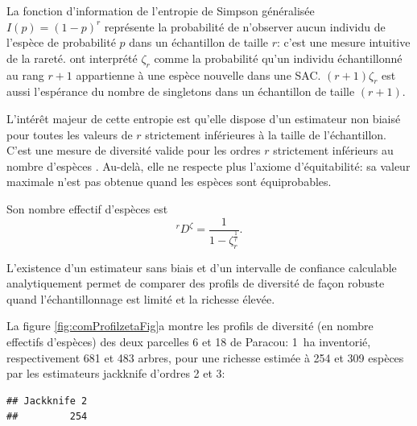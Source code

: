 \documentclass[
  11pt,
  french,
  a4paper,
  extrafontsizes,onecolumn,openright
  ]{memoir}
\newenvironment{Shaded}{\begin{snugshade}}{\end{snugshade}}
\newcommand{\AttributeTok}[1]{\textcolor[rgb]{0.13,0.29,0.53}{#1}}
\newcommand{\DecValTok}[1]{\textcolor[rgb]{0.00,0.00,0.81}{#1}}
\newcommand{\FunctionTok}[1]{\textcolor[rgb]{0.13,0.29,0.53}{\textbf{#1}}}
\newcommand{\NormalTok}[1]{#1}
\newcommand{\OtherTok}[1]{\textcolor[rgb]{0.56,0.35,0.01}{#1}}
\newcommand{\SpecialCharTok}[1]{\textcolor[rgb]{0.81,0.36,0.00}{\textbf{#1}}}
\newcommand{\StringTok}[1]{\textcolor[rgb]{0.31,0.60,0.02}{#1}}
\begin{document}
La fonction d'information de l'entropie de Simpson généralisée \(I(p)=(1-p)^r\) représente la probabilité de n'observer aucun individu de l'espèce de probabilité \(p\) dans un échantillon de taille \(r\): c'est une mesure intuitive de la rareté.
\textcite{Chao2013} ont interprété \(\zeta_r\) comme la probabilité qu'un individu échantillonné au rang \(r+1\) appartienne à une espèce nouvelle dans une SAC.
\((r+1)\zeta_r\) est aussi l'espérance du nombre de singletons dans un échantillon de taille \((r+1)\).

L'intérêt majeur de cette entropie est qu'elle dispose d'un estimateur non biaisé pour toutes les valeurs de \(r\) strictement inférieures à la taille de l'échantillon.
C'est une mesure de diversité valide pour les ordres \(r\) strictement inférieurs au nombre d'espèces \autocite{Grabchak2016}.
Au-delà, elle ne respecte plus l'axiome d'équitabilité: sa valeur maximale n'est pas obtenue quand les espèces sont équiprobables.

Son nombre effectif d'espèces est
\begin{equation}
  \label{eq:Dzeta}
  ^{r}\!D^{\zeta} = \frac{1}{1 - \zeta_r^{\frac{1}{r}}}.
\end{equation}

L'existence d'un estimateur sans biais et d'un intervalle de confiance calculable analytiquement permet de comparer des profils de diversité de façon robuste quand l'échantillonnage est limité et la richesse élevée.

La figure \ref{fig:comProfilzetaFig}a montre les profils de diversité (en nombre effectifs d'espèces) des deux parcelles 6 et 18 de Paracou: 1~ha inventorié, respectivement 681 et 483 arbres, pour une richesse estimée à 254 et 309 espèces par les estimateurs jackknife d'ordres 2 et 3:

\scriptsize

\begin{Shaded}
\end{Shaded}

\begin{verbatim}
## Jackknife 2 
##         254
\end{verbatim}
\end{document}
